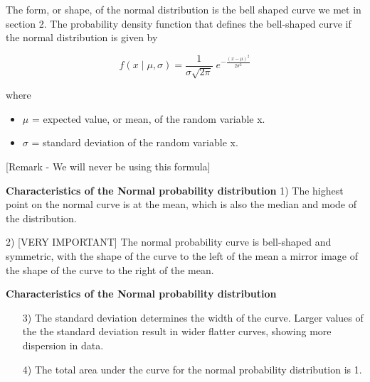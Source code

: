 \documentclass[IntroMain.tex]{subfiles}
\begin{document}
	\begin{frame}
		
The form, or shape, of the normal distribution is the bell shaped curve we met in section 2.
The probability density function that defines the bell-shaped curve if the normal distribution is given by




\[f(x \; | \; \mu, \sigma) = \frac{1}{\sigma\sqrt{2\pi} } \; e^{ -\frac{(x-\mu)^2}{2\sigma^2} }\]

where 

\begin{itemize}
 \item $\mu$ = expected value, or mean, of the random variable x.
 \item $\sigma$  = standard deviation of the random variable x.
\end{itemize}
[Remark - We will never be using this formula]

\end{frame}
\begin{frame}
\textbf{Characteristics of the Normal probability distribution}
\Large
1) The highest point on the normal curve is at the mean, which is also the median and mode of the distribution.


2) [VERY IMPORTANT]
The normal probability curve is bell-shaped and symmetric, with the shape of the curve to the left of the mean a mirror image of the shape of the curve to the right of the mean.
\end{frame}
\begin{frame}
	\textbf{Characteristics of the Normal probability distribution}
	\Large
	
\begin{itemize}
\item[3)] The standard deviation determines the width of the curve. Larger values of the the standard deviation result in wider flatter curves, showing more dispersion in data.


\item[4)] The total area under the curve for the normal probability distribution is 1.
\end{itemize}

\end{frame}
\end{document}
